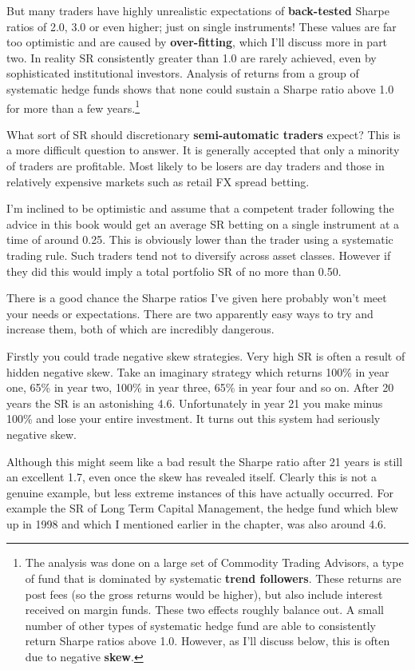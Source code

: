 But many traders have highly unrealistic expectations of \textbf{back-tested} Sharpe ratios of 2.0, 3.0 or even higher; just on single instruments! These values are far too optimistic and are caused by \textbf{over-fitting}, which I'll discuss more in part two. In reality SR consistently greater than 1.0 are rarely achieved, even by sophisticated institutional investors. Analysis of returns from a group of systematic hedge funds shows that none could sustain a Sharpe ratio above 1.0 for more than a few years.\footnote{The analysis was done on a large set of Commodity Trading Advisors, a type of fund that is dominated by systematic \textbf{trend followers}. These returns are post fees (so the gross returns would be higher), but also include interest received on margin funds. These two effects roughly balance out. A small number of other types of systematic hedge fund are able to consistently return Sharpe ratios above 1.0. However, as I'll discuss below, this is often due to negative \textbf{skew}.}

What sort of SR should discretionary \textbf{semi-automatic traders} expect? This is a more difficult question to answer. It is generally accepted that only a minority of traders are profitable. Most likely to be losers are day traders and those in relatively expensive markets such as retail FX spread betting.

I'm inclined to be optimistic and assume that a competent trader following the advice in this book would get an average SR betting on a single instrument at a time of around 0.25. This is obviously lower than the trader using a systematic trading rule. Such traders tend not to diversify across asset classes. However if they did this would imply a total portfolio SR of no more than 0.50.

There is a good chance the Sharpe ratios I've given here probably won't meet your needs or expectations. There are two apparently easy ways to try and increase them, both of which are incredibly dangerous.

Firstly you could trade negative skew strategies. Very high SR is often a result of hidden negative skew. Take an imaginary strategy which returns 100\% in year one, 65\% in year two, 100\% in year three, 65\% in year four and so on. After 20 years the SR is an astonishing 4.6. Unfortunately in year 21 you make minus 100\% and lose your entire investment. It turns out this system had seriously negative skew.

Although this might seem like a bad result the Sharpe ratio after 21 years is still an excellent 1.7, even once the skew has revealed itself. Clearly this is not a genuine example, but less extreme instances of this have actually occurred. For example the SR of Long Term Capital Management, the hedge fund which blew up in 1998 and which I mentioned earlier in the chapter, was also around 4.6.


